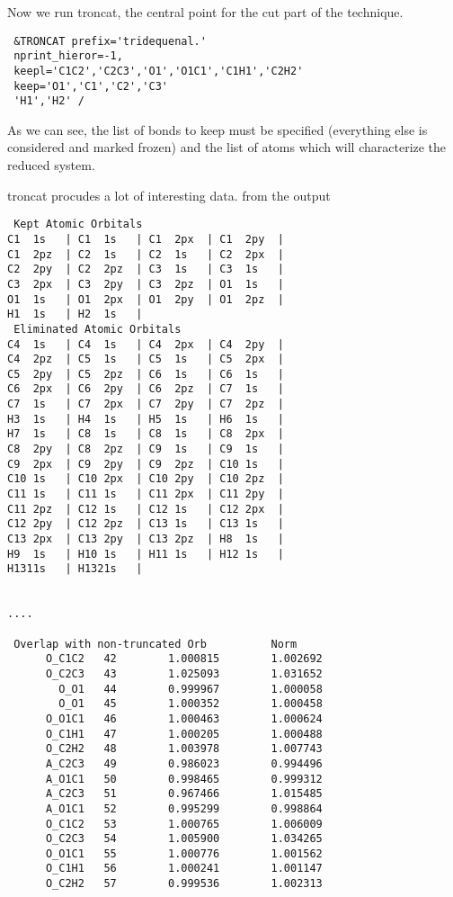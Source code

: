 \documentclass[11pt,a4paper]{article}
\begin{document}
Now we run troncat, the central point for the cut part of the technique.

\begin{verbatim}
 &TRONCAT prefix='tridequenal.'
 nprint_hieror=-1,
 keepl='C1C2','C2C3','O1','O1C1','C1H1','C2H2'
 keep='O1','C1','C2','C3'
 'H1','H2' /
\end{verbatim}

As we can see, the list of bonds to keep must be specified (everything else
is considered and marked frozen) and the list of atoms which will
characterize the reduced system.

troncat procudes a lot of interesting data. from the output

\begin{verbatim}
 Kept Atomic Orbitals
C1  1s   | C1  1s   | C1  2px  | C1  2py  | 
C1  2pz  | C2  1s   | C2  1s   | C2  2px  |
C2  2py  | C2  2pz  | C3  1s   | C3  1s   |
C3  2px  | C3  2py  | C3  2pz  | O1  1s   |
O1  1s   | O1  2px  | O1  2py  | O1  2pz  |
H1  1s   | H2  1s   | 
 Eliminated Atomic Orbitals
C4  1s   | C4  1s   | C4  2px  | C4  2py  |
C4  2pz  | C5  1s   | C5  1s   | C5  2px  |
C5  2py  | C5  2pz  | C6  1s   | C6  1s   |
C6  2px  | C6  2py  | C6  2pz  | C7  1s   |
C7  1s   | C7  2px  | C7  2py  | C7  2pz  |
H3  1s   | H4  1s   | H5  1s   | H6  1s   |
H7  1s   | C8  1s   | C8  1s   | C8  2px  |
C8  2py  | C8  2pz  | C9  1s   | C9  1s   |
C9  2px  | C9  2py  | C9  2pz  | C10 1s   |
C10 1s   | C10 2px  | C10 2py  | C10 2pz  |
C11 1s   | C11 1s   | C11 2px  | C11 2py  |
C11 2pz  | C12 1s   | C12 1s   | C12 2px  |
C12 2py  | C12 2pz  | C13 1s   | C13 1s   |
C13 2px  | C13 2py  | C13 2pz  | H8  1s   |
H9  1s   | H10 1s   | H11 1s   | H12 1s   |
H1311s   | H1321s   | 


....

 Overlap with non-truncated Orb          Norm
      O_C1C2   42        1.000815        1.002692
      O_C2C3   43        1.025093        1.031652
        O_O1   44        0.999967        1.000058
        O_O1   45        1.000352        1.000458
      O_O1C1   46        1.000463        1.000624
      O_C1H1   47        1.000205        1.000488
      O_C2H2   48        1.003978        1.007743
      A_C2C3   49        0.986023        0.994496
      A_O1C1   50        0.998465        0.999312
      A_C2C3   51        0.967466        1.015485
      A_O1C1   52        0.995299        0.998864
      O_C1C2   53        1.000765        1.006009
      O_C2C3   54        1.005900        1.034265
      O_O1C1   55        1.000776        1.001562
      O_C1H1   56        1.000241        1.001147
      O_C2H2   57        0.999536        1.002313

\end{verbatim}
\end{document}
